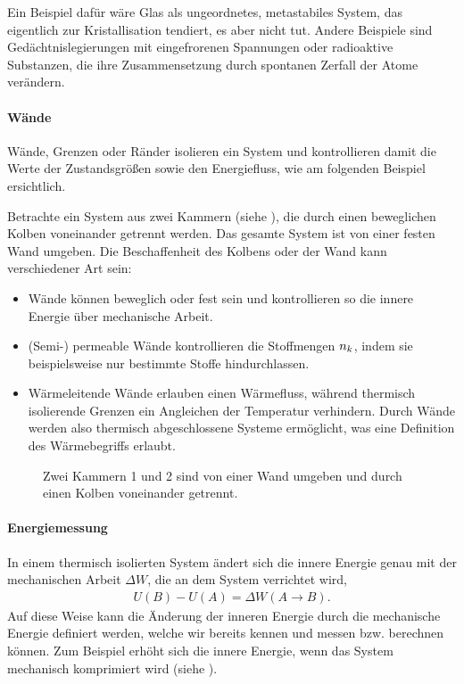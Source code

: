 Ein Beispiel dafür %
wäre Glas als ungeordnetes, metastabiles System, das eigentlich zur Kristallisation tendiert, es aber nicht tut. Andere Beispiele sind Gedächtnislegierungen mit eingefrorenen Spannungen oder radioaktive Substanzen, die ihre Zusammensetzung durch spontanen Zerfall der Atome verändern.


\paragraph*{Wände}

Wände, Grenzen oder Ränder isolieren ein System und kontrollieren damit die Werte der Zustandsgrößen sowie den Energiefluss, wie am folgenden Beispiel ersichtlich.

Betrachte ein System aus zwei Kammern (siehe ), die durch einen beweglichen Kolben voneinander getrennt werden. Das gesamte System ist von einer festen Wand umgeben. Die Beschaffenheit des Kolbens oder der Wand kann verschiedener Art sein:
\begin{itemize}
    \item Wände können beweglich oder fest sein und kontrollieren so die innere Energie über mechanische Arbeit.
    \item (Semi-) permeable Wände kontrollieren die Stoffmengen $n_k$, indem sie beispielsweise nur bestimmte Stoffe hindurchlassen.
    \item Wärmeleitende Wände erlauben einen Wärmefluss, während thermisch isolierende Grenzen ein Angleichen der Temperatur verhindern. Durch Wände werden also thermisch abgeschlossene Systeme ermöglicht, was eine Definition des Wärmebegriffs erlaubt.
\end{itemize}

\begin{figure}[htb]
    \centering
    \tfigTwoChambersSeparatedByPiston
    \caption{Zwei Kammern 1 und 2 sind von einer Wand umgeben und durch einen Kolben voneinander getrennt. }
    \label{fig:TwoChambersSeparatedByPiston}
\end{figure}




\paragraph*{Energiemessung}

In einem thermisch isolierten System ändert sich die innere Energie genau mit der mechanischen Arbeit $\Delta W$, die an dem System verrichtet wird,
\begin{align*}
    U(B)-U(A) =\Delta W(A\rightarrow B).
\end{align*}
Auf diese Weise kann die Änderung der inneren Energie durch die mechanische Energie definiert werden, welche wir bereits kennen und messen bzw. berechnen können.
Zum Beispiel erhöht sich die innere Energie, wenn das System mechanisch komprimiert wird (siehe ).

